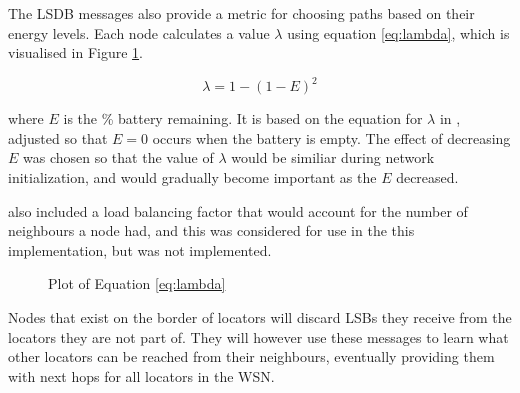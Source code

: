 \documentclass[12pt]{article}
\begin{document}
The LSDB messages also provide a metric for choosing paths based on their energy levels. Each node calculates a value $\lambda$ using equation \ref{eq:lambda}, which is visualised in Figure \ref{fig:lambda}. 

\begin{equation} \label{eq:lambda}
	\lambda = 1 -(1 - E)^2
\end{equation}

where $E$ is the \% battery remaining. It is based on the equation for $\lambda$ in \cite{groups}, adjusted so that $E = 0$ occurs when the battery is empty. 
The effect of decreasing $E$ was chosen so that the value of $\lambda$ would be similiar during network initialization, and would gradually become important as the $E$ decreased.

\cite{groups} also included a load balancing factor that would account for the number of neighbours a node had, and this was considered for use in the this implementation, but was not implemented.

\begin{figure}[h]
	\centering
	   \caption{Plot of Equation \ref{eq:lambda}}
	\label{fig:lambda}
\end{figure}

Nodes that exist on the border of locators will discard LSBs they receive from the locators they are not part of. They will however use these messages to learn what other locators can be reached from their neighbours, eventually providing them with next hops for all locators in the WSN.
\end{document}
